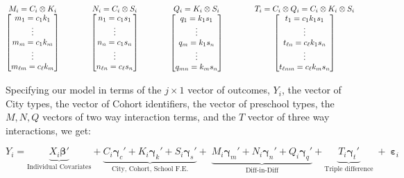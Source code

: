 \documentclass[11pt]{article}
\begin{document}
\begin{equation*}
\underset{\begin{bmatrix} m_1 = c_1 k_1 \\
\vdots  \\
m_m = c_1 k_m  \\
\vdots  \\
m_{\ell m} = c_{\ell} k_m 
\end{bmatrix}}{M_i = C_i \otimes K_i  } \qquad \qquad
 \underset{\begin{bmatrix} n_1 = c_1 s_1 \\
\vdots  \\
n_n = c_1 s_n  \\
\vdots  \\
n_{\ell n} = c_{\ell} s_n 
\end{bmatrix}}{N_i = C_i \otimes S_i} \qquad \qquad
\underset{\begin{bmatrix} q_1 = k_1 s_1 \\
\vdots  \\
q_m = k_1 s_n  \\
\vdots  \\
q_{m n} = k_{m} s_n 
\end{bmatrix}}{Q_i = K_i \otimes S_i } \qquad \qquad
\underset{\begin{bmatrix} t_1 = c_1 k_1 s_1  \\
\vdots  \\
t_{\ell n} = c_{\ell} k_1 s_n  \\
\vdots  \\
t_{\ell n m} = c_{\ell} k_m s_n  \\
\end{bmatrix}}{T_i = C_i \otimes Q_i \\
= C_i \otimes K_i \otimes S_i }
\end{equation*}


Specifying our model in terms of the $j \times 1$ vector of outcomes, $Y_i$, the vector of City types, the vector of Cohort identifiers, the vector of preschool types, the $M,N,Q$ vectors of two way interaction terms, and the $T$ vector of three way interactions, we get:

\begin{equation} \label{eq:diffs}
Y_i = \underbrace{X_i \boldsymbol{\beta}'}_{\text{Individual Covariates}} + \underbrace{C_i \boldsymbol{\gamma}_c' + K_i \boldsymbol{\gamma}_k' + S_i \boldsymbol{\gamma}_s'}_{\text{City, Cohort, School F.E.}}  +\; \underbrace{M_i \boldsymbol{\gamma}_m' + N_i \boldsymbol{\gamma}_n' + Q_i \boldsymbol{\gamma}_q'}_{\text{Diff-in-Diff}} + \underbrace{T_i \boldsymbol{\gamma}_t'}_{\text{Triple difference}} \; + \; \boldsymbol{\varepsilon}_{i}
\end{equation}
\end{document}
